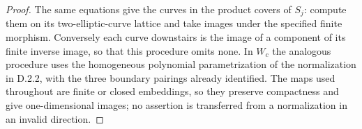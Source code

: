 \begin{proof}
The same equations give the curves in the product covers of $S_j$:
compute them on its two-elliptic-curve lattice and take images under the
specified finite morphism. Conversely each curve downstairs is the image
of a component of its finite inverse image, so that this procedure omits
none. In $W_c$ the analogous procedure uses the homogeneous polynomial
parametrization of the normalization in D.2.2, with the three boundary
pairings already identified. The maps used throughout are finite or
closed embeddings, so they preserve compactness and give one-dimensional
images; no assertion is transferred from a normalization in an invalid
direction.
\end{proof}
